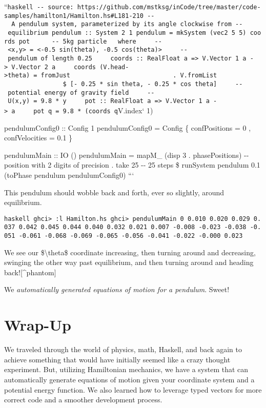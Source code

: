 \documentclass[]{article}
\begin{document}
``\texttt{haskell\ -\/-\ source:\ https://github.com/mstksg/inCode/tree/master/code-samples/hamilton1/Hamilton.hs\#L181-210\ -\/-\ \textbar{}\ A\ pendulum\ system,\ parameterized\ by\ its\ angle\ clockwise\ from\ -\/-\ equilibrium\ pendulum\ ::\ System\ 2\ 1\ pendulum\ =\ mkSystem\ (vec2\ 5\ 5)\ coords\ pot\ \ \ \ \ \ -\/-\ 5kg\ particle\ \ \ where\ \ \ \ \ -\/-\ \textless{}x,y\textgreater{}\ =\ \textless{}-0.5\ sin(theta),\ -0.5\ cos(theta)\textgreater{}\ \ \ \ \ -\/-\ pendulum\ of\ length\ 0.25\ \ \ \ \ coords\ ::\ RealFloat\ a\ =\textgreater{}\ V.Vector\ 1\ a\ -\textgreater{}\ V.Vector\ 2\ a\ \ \ \ \ coords\ (V.head-\textgreater{}theta)\ =\ fromJust\ \ \ \ \ \ \ \ \ \ \ \ \ \ \ \ \ \ \ \ \ \ \ \ \ \ \ \ .\ V.fromList\ \ \ \ \ \ \ \ \ \ \ \ \ \ \ \ \ \ \ \ \ \ \ \ \ \ \ \ \$\ {[}-\ 0.25\ *\ sin\ theta,\ -\ 0.25\ *\ cos\ theta{]}\ \ \ \ \ -\/-\ potential\ energy\ of\ gravity\ field\ \ \ \ \ -\/-\ U(x,y)\ =\ 9.8\ *\ y\ \ \ \ \ pot\ ::\ RealFloat\ a\ =\textgreater{}\ V.Vector\ 1\ a\ -\textgreater{}\ a\ \ \ \ \ pot\ q\ =\ 9.8\ *\ (coords\ q}V.index`
1)

pendulumConfig0 :: Config 1 pendulumConfig0 = Config \{ confPositions = 0 ,
confVelocities = 0.1 \}

pendulumMain :: IO () pendulumMain = mapM\_ (disp 3 . phasePositions) -\/-
position with 2 digits of precision . take 25 -\/- 25 steps \$ runSystem
pendulum 0.1 (toPhase pendulum pendulumConfig0) ```

This pendulum should wobble back and forth, ever so slightly, around
equilibrium.

\texttt{haskell\ ghci\textgreater{}\ :l\ Hamilton.hs\ ghci\textgreater{}\ pendulumMain\ 0\ 0.010\ 0.020\ 0.029\ 0.037\ 0.042\ 0.045\ 0.044\ 0.040\ 0.032\ 0.021\ 0.007\ -0.008\ -0.023\ -0.038\ -0.051\ -0.061\ -0.068\ -0.069\ -0.065\ -0.056\ -0.041\ -0.022\ -0.000\ 0.023}

We see our \$\textbackslash{}theta\$ coordinate increasing, then turning around
and decreasing, swinging the other way past equilibrium, and then turning around
and heading back!{[}\^{}phantom{]}

We \emph{automatically generated equations of motion for a pendulum}. Sweet!

\section{Wrap-Up}

We traveled through the world of physics, math, Haskell, and back again to
achieve something that would have initially seemed like a crazy thought
experiment. But, utilizing Hamiltonian mechanics, we have a system that can
automatically generate equations of motion given your coordinate system and a
potential energy function. We also learned how to leverage typed vectors for
more correct code and a smoother development process.
\end{document}
